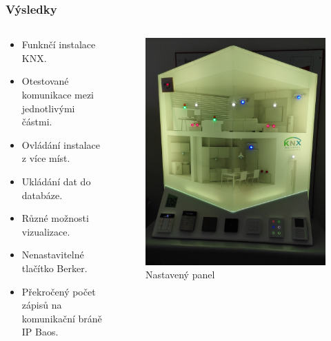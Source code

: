 \documentclass[%
  12pt,       				%
	t,                  %
	aspectratio=1610,   %
	unicode,						%
]{beamer}				    	%
\begin{document}
\begin{frame} 
	\frametitle{Výsledky}
	\begin{columns}[T] 								%
		\begin{column}{0.6\textwidth}		%
			\begin{itemize}
				\item Funknčí instalace KNX.
				\item Otestované komunikace mezi jednotlivými částmi.
				\item Ovládání instalace z více míst. 
				\item Ukládání dat do databáze.
				\item Různé možnosti vizualizace.
				\item Nenastavitelné tlačítko Berker.
				\item Překročený počet zápisů na komunikační bráně IP Baos.
			\end{itemize}
		\end{column}
	\begin{column}{0.4\textwidth}		%
			\begin{figure}%
				\includegraphics[width=.8\columnwidth]{obrazky/IMG_20211217_121402.jpg}
				\caption{Nastavený panel}
			\end{figure}
		\end{column}
	\end{columns}
\end{frame}
\end{document}

